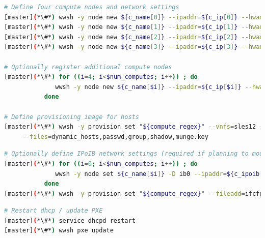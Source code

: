 \documentclass[letterpaper]{article}
\begin{document}
\begin{lstlisting}[language=bash,keywords={},upquote=true,basicstyle=\footnotesize\ttfamily]
# Define four compute nodes and network settings 
[master](*\#*) wwsh -y node new ${c_name[0]} --ipaddr=${c_ip[0]} --hwaddr=${c_mac[0]} -D ${eth_provision}
[master](*\#*) wwsh -y node new ${c_name[1]} --ipaddr=${c_ip[1]} --hwaddr=${c_mac[1]} -D ${eth_provision}
[master](*\#*) wwsh -y node new ${c_name[2]} --ipaddr=${c_ip[2]} --hwaddr=${c_mac[2]} -D ${eth_provision}
[master](*\#*) wwsh -y node new ${c_name[3]} --ipaddr=${c_ip[3]} --hwaddr=${c_mac[3]} -D ${eth_provision}

# Optionally register additional compute nodes
[master](*\#*) for ((i=4; i<$num_computes; i++)) ; do
              wwsh -y node new ${c_name[$i]} --ipaddr=${c_ip[$i]} --hwaddr=${c_mac[$i]} -D ${eth_provision}
           done

# Define provisioning image for hosts
[master](*\#*) wwsh -y provision set "${compute_regex}" --vnfs=sles12 --bootstrap=`uname -r` \
     --files=dynamic_hosts,passwd,group,shadow,munge.key 
\end{lstlisting}

\begin{lstlisting}[language=bash,keywords={},upquote=true,basicstyle=\footnotesize\ttfamily]
# Optionally define IPoIB network settings (required if planning to mount Lustre over IB)
[master](*\#*) for ((i=0; i<$num_computes; i++)) ; do
              wwsh -y node set ${c_name[$i]} -D ib0 --ipaddr=${c_ipoib[$i]} --netmask=${ipoib_netmask}
           done
[master](*\#*) wwsh -y provision set "${compute_regex}" --fileadd=ifcfg-ib0.ww
\end{lstlisting}

\clearpage
\begin{lstlisting}[language=bash,keywords={},upquote=true,basicstyle=\footnotesize\ttfamily]
# Restart dhcp / update PXE
[master](*\#*) service dhcpd restart
[master](*\#*) wwsh pxe update
\end{lstlisting}


\end{document}
